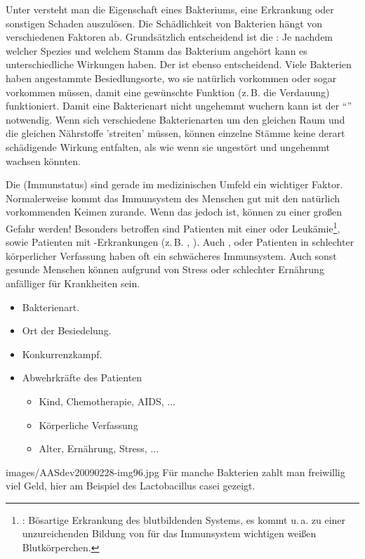{%
Unter  versteht man die Eigenschaft eines Bakteriums, eine
Erkrankung oder sonstigen Schaden auszulösen. Die Schädlichkeit von Bakterien
hängt von verschiedenen Faktoren ab. Grundsätzlich entscheidend ist die : Je nachdem welcher Spezies und welchem Stamm das Bakterium angehört kann es unterschiedliche
Wirkungen haben. Der  ist ebenso entscheidend. Viele
Bakterien haben angestammte Besiedlungsorte, wo sie natürlich vorkommen oder
sogar vorkommen müssen, damit eine gewünschte Funktion (z.\,B. die Verdauung)
funktioniert. Damit eine Bakterienart nicht ungehemmt wuchern kann ist der
"`"' notwendig. Wenn sich verschiedene
Bakterienarten um den gleichen Raum und die gleichen Nährstoffe 'streiten'
müssen, können einzelne Stämme keine derart schädigende Wirkung entfalten, als
wie wenn sie ungestört und ungehemmt wachsen könnten. 

Die  (Immunstatus) sind gerade im medizinischen
Umfeld ein wichtiger Faktor. Normalerweise kommt das Immunsystem des Menschen
gut mit den natürlich vorkommenden Keimen zurande. Wenn das  jedoch
 ist, können   zu
einer großen Gefahr werden! Besonders betroffen sind Patienten mit einer 
 oder Leukämie\footnote{:
Bösartige Erkrankung des blutbildenden Systems, es kommt u.\,a. zu einer
unzureichenden Bildung von für das Immunsystem wichtigen weißen Blutkörperchen.}, sowie
Patienten mit -Erkrankungen (z.\,B. ,
). Auch ,  oder Patienten in
schlechter körperlicher Verfassung haben oft ein schwächeres Immunsystem. Auch
sonst gesunde Menschen können aufgrund von Stress oder schlechter Ernährung anfälliger für Krankheiten
sein. 
}{
\begin{itemize}
  \item Bakterienart. 
  \item Ort der Besiedelung.
  \item Konkurrenzkampf. 
  \item Abwehrkräfte des Patienten
  \begin{itemize}
    \item Kind, Chemotherapie, AIDS, ...
    \item Körperliche Verfassung
    \item Alter, Ernährung, Stress, ...
  \end{itemize}
\end{itemize}
}
{images/AASdev20090228-img96.jpg}
{Für manche Bakterien zahlt man
    freiwillig viel Geld, hier am Beispiel des
    Lactobacillus casei gezeigt.}
{}



